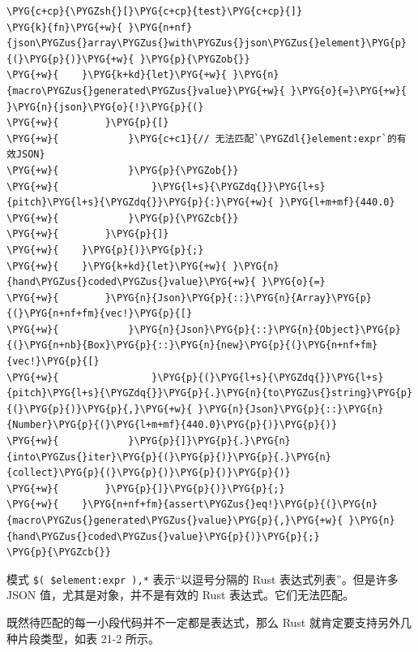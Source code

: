 \begin{Verbatim}[commandchars=\\\{\},breaklines=true,breakanywhere=true,fontsize=\codefont,xleftmargin=17bp]
\PYG{c+cp}{\PYGZsh{}[}\PYG{c+cp}{test}\PYG{c+cp}{]}
\PYG{k}{fn}\PYG{+w}{ }\PYG{n+nf}{json\PYGZus{}array\PYGZus{}with\PYGZus{}json\PYGZus{}element}\PYG{p}{(}\PYG{p}{)}\PYG{+w}{ }\PYG{p}{\PYGZob{}}
\PYG{+w}{    }\PYG{k+kd}{let}\PYG{+w}{ }\PYG{n}{macro\PYGZus{}generated\PYGZus{}value}\PYG{+w}{ }\PYG{o}{=}\PYG{+w}{ }\PYG{n}{json}\PYG{o}{!}\PYG{p}{(}
\PYG{+w}{        }\PYG{p}{[}
\PYG{+w}{            }\PYG{c+c1}{// 无法匹配`\PYGZdl{}element:expr`的有效JSON}
\PYG{+w}{            }\PYG{p}{\PYGZob{}}
\PYG{+w}{                }\PYG{l+s}{\PYGZdq{}}\PYG{l+s}{pitch}\PYG{l+s}{\PYGZdq{}}\PYG{p}{:}\PYG{+w}{ }\PYG{l+m+mf}{440.0}
\PYG{+w}{            }\PYG{p}{\PYGZcb{}}
\PYG{+w}{        }\PYG{p}{]}
\PYG{+w}{    }\PYG{p}{)}\PYG{p}{;}
\PYG{+w}{    }\PYG{k+kd}{let}\PYG{+w}{ }\PYG{n}{hand\PYGZus{}coded\PYGZus{}value}\PYG{+w}{ }\PYG{o}{=}
\PYG{+w}{        }\PYG{n}{Json}\PYG{p}{::}\PYG{n}{Array}\PYG{p}{(}\PYG{n+nf+fm}{vec!}\PYG{p}{[}
\PYG{+w}{            }\PYG{n}{Json}\PYG{p}{::}\PYG{n}{Object}\PYG{p}{(}\PYG{n+nb}{Box}\PYG{p}{::}\PYG{n}{new}\PYG{p}{(}\PYG{n+nf+fm}{vec!}\PYG{p}{[}
\PYG{+w}{                }\PYG{p}{(}\PYG{l+s}{\PYGZdq{}}\PYG{l+s}{pitch}\PYG{l+s}{\PYGZdq{}}\PYG{p}{.}\PYG{n}{to\PYGZus{}string}\PYG{p}{(}\PYG{p}{)}\PYG{p}{,}\PYG{+w}{ }\PYG{n}{Json}\PYG{p}{::}\PYG{n}{Number}\PYG{p}{(}\PYG{l+m+mf}{440.0}\PYG{p}{)}\PYG{p}{)}
\PYG{+w}{            }\PYG{p}{]}\PYG{p}{.}\PYG{n}{into\PYGZus{}iter}\PYG{p}{(}\PYG{p}{)}\PYG{p}{.}\PYG{n}{collect}\PYG{p}{(}\PYG{p}{)}\PYG{p}{)}\PYG{p}{)}
\PYG{+w}{        }\PYG{p}{]}\PYG{p}{)}\PYG{p}{;}
\PYG{+w}{    }\PYG{n+nf+fm}{assert\PYGZus{}eq!}\PYG{p}{(}\PYG{n}{macro\PYGZus{}generated\PYGZus{}value}\PYG{p}{,}\PYG{+w}{ }\PYG{n}{hand\PYGZus{}coded\PYGZus{}value}\PYG{p}{)}\PYG{p}{;}
\PYG{p}{\PYGZcb{}}
\end{Verbatim}

模式 \texttt{\$( \$element:expr ),*} 表示“以逗号分隔的 Rust 表达式列表”。但是许多 JSON 值，尤其是对象，并不是有效的 Rust 表达式。它们无法匹配。

既然待匹配的每一小段代码并不一定都是表达式，那么 Rust 就肯定要支持另外几种片段类型，如表 21-2 所示。


